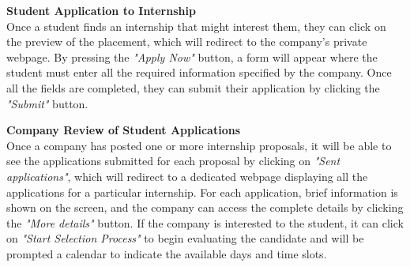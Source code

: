 {\begin{enumerate}[label=\textbf{[\arabic*]}, left = 0 pt, align = left]
\item \textbf{Student Application to Internship}                      
\\Once a student finds an internship that might interest them, they can click on the preview of the placement, which will redirect to the company's private webpage. By pressing the \textit{"Apply Now"} button, a form will appear where the student must enter all the required information specified by the company. Once all the fields are completed, they can submit their application by clicking the \textit{"Submit"} button.

\item \textbf{Company Review of Student Applications}           %
\\Once a company has posted one or more internship proposals, it will be able to see the applications submitted for each proposal by clicking on \textit{"Sent applications"}, which will redirect to a dedicated webpage displaying all the applications for a particular internship. For each application, brief information is shown on the screen, and the company can access the complete details by clicking the \textit{"More details"} button. If the company is interested to the student, it can click on \textit{"Start Selection Process"} to begin evaluating the candidate and will be prompted a calendar to indicate the available days and time slots.


\end{enumerate}}
